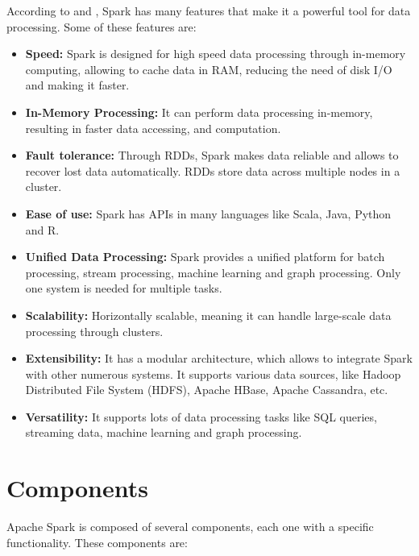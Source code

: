 According to \cite{openai_chatgpt} and \cite{apache_spark}, Spark has many
features that make it a powerful tool for data processing. Some of these
features are:

\begin{itemize}
    \item \textbf{Speed:} Spark is designed for high speed data processing
    through in-memory computing, allowing to cache data in RAM, reducing the
    need of disk I/O and making it faster.
    \item \textbf{In-Memory Processing:} It can perform data processing
    in-memory, resulting in faster data accessing, and computation.
    \item \textbf{Fault tolerance:} Through RDDs, Spark makes data reliable and
    allows to recover lost data automatically. RDDs store data across multiple
    nodes in a cluster.
    \item \textbf{Ease of use:} Spark has APIs in many languages like Scala,
    Java, Python and R.
    \item \textbf{Unified Data Processing:} Spark provides a unified platform
    for batch processing, stream processing, machine learning and graph
    processing. Only one system is needed for multiple tasks.
    \item \textbf{Scalability:} Horizontally scalable, meaning it can handle
    large-scale data processing through clusters.
    \item \textbf{Extensibility:} It has a modular architecture, which allows
    to integrate Spark with other numerous systems. It supports various data
    sources, like Hadoop Distributed File System (HDFS), Apache HBase, Apache
    Cassandra, etc.
    \item \textbf{Versatility:} It supports lots of data processing tasks like
    SQL queries, streaming data, machine learning and graph processing.
\end{itemize}

\section{Components}

Apache Spark is composed of several components, each one with a specific
functionality. These components are:

